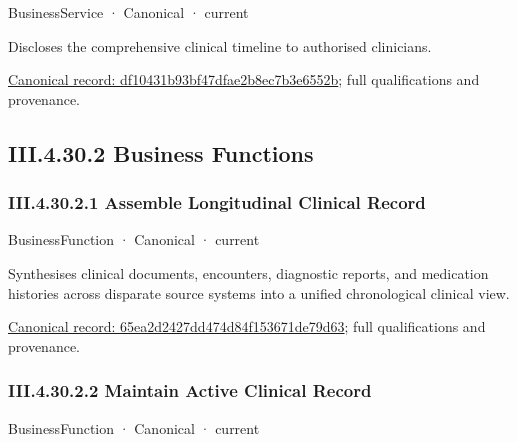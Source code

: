 \label{element:df10431b93bf47dfae2b8ec7b3e6552b}
{\small BusinessService · Canonical · current}\par

Discloses the comprehensive clinical timeline to authorised clinicians.


{\footnotesize \href{../../../../continuum/business/business-service/df10431b93bf47dfae2b8ec7b3e6552b.md}{Canonical record: df10431b93bf47dfae2b8ec7b3e6552b}; full qualifications and provenance.}\par
\subsection*{III.4.30.2 Business Functions}
\label{navigation:III.4.30.2}

\subsubsection*{III.4.30.2.1 Assemble Longitudinal Clinical Record}
\label{navigation:III.4.30.2.1}

\label{element:65ea2d2427dd474d84f153671de79d63}
{\small BusinessFunction · Canonical · current}\par

Synthesises clinical documents, encounters, diagnostic reports, and medication histories across disparate source systems into a unified chronological clinical view.


{\footnotesize \href{../../../../continuum/business/business-function/65ea2d2427dd474d84f153671de79d63.md}{Canonical record: 65ea2d2427dd474d84f153671de79d63}; full qualifications and provenance.}\par
\subsubsection*{III.4.30.2.2 Maintain Active Clinical Record}
\label{navigation:III.4.30.2.2}

\label{element:dbccf500cf4a44e0987f972311bab03a}
{\small BusinessFunction · Canonical · current}\par

